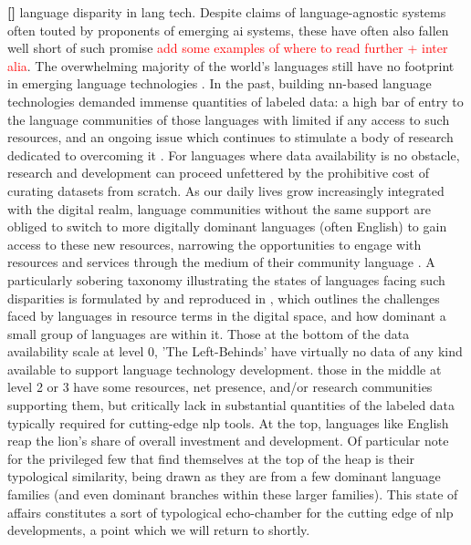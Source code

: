 \documentclass[thesis]{cluu}
\newcounter{paranum}
\newcommand{\numberedparagraph}{\par\refstepcounter{paranum}\textbf{[\theparanum] }}
\newcommand{\todo}[1]{\textcolor{red}{#1}}
\begin{document}
\numberedparagraph{language disparity in lang tech.} 
Despite claims of language-agnostic systems often touted by proponents of emerging \gls{ai} systems, these have often also fallen well short of such promise \parencite{benderAchievingEvaluatingLanguageIndependence2011}\todo{add some examples of where to read further + inter alia}. The overwhelming majority of the world's languages still have no footprint in emerging language technologies \parencite{joshiStateFateLinguistic2021}. In the past, building \gls{nn}-based language technologies demanded immense quantities of labeled data: a high bar of entry to the language communities of those languages with limited if any access to such resources, and an ongoing issue which continues to stimulate a body of research dedicated to overcoming it \parencite[see][for an overview]{magueresseLowresourceLanguagesReview2020}. For languages where data availability is no obstacle, research and development can proceed unfettered by the prohibitive cost of curating datasets from scratch. As our daily lives grow increasingly integrated with the digital realm, language communities without the same support are obliged to switch to more digitally dominant languages (often English) to gain access to these new resources, narrowing the opportunities to engage with resources and services through the medium of their community language \parencite{nichasaideCanWeDefuse2019}. A particularly sobering taxonomy illustrating the states of languages facing such disparities is formulated by \textcite{joshiStateFateLinguistic2021} and reproduced in , which outlines the challenges faced by languages in resource terms in the digital space, and how dominant a small group of languages are within it. Those at the bottom of the data availability scale at level 0, 'The Left-Behinds' have virtually no data of any kind available to support language technology development. those in the middle at level 2 or 3 have some resources, net presence, and/or research communities supporting them, but critically lack in substantial quantities of the labeled data typically required for cutting-edge \gls{nlp} tools. At the top, languages like English reap the lion's share of overall investment and development. Of particular note for the privileged few that find themselves at the top of the heap is their typological similarity, being drawn as they are from a few dominant language families (and even dominant branches within these larger families). This state of affairs constitutes a sort of typological echo-chamber for the cutting edge of \gls{nlp} developments, a point which we will return to shortly.
\end{document}
